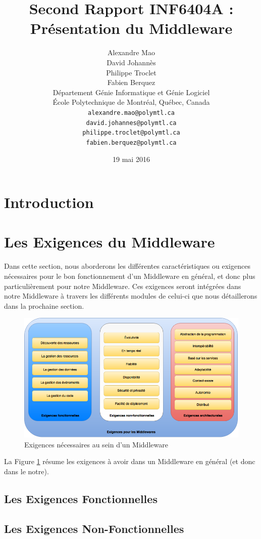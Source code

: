 \documentclass{article}
\title{Second Rapport INF6404A : Présentation du Middleware}
\author{
	Alexandre Mao\\
	David Johannès \\
	Philippe Troclet \\
	Fabien Berquez \\
	D\'{e}partement G\'{e}nie Informatique et G\'{e}nie Logiciel \\
	\'{E}cole Polytechnique de Montr\'{e}al, Qu\'{e}bec, Canada \\
	\texttt{alexandre.mao@polymtl.ca}\\
	\texttt{david.johannes@polymtl.ca}\\
	\texttt{philippe.troclet@polymtl.ca}   \\
	\texttt{fabien.berquez@polymtl.ca}   \\
}
\date{19 mai 2016}
\begin{document}
\maketitle

\section{Introduction}


\section{Les Exigences du Middleware}
Dans cette section, nous aborderons les différentes caractéristiques ou exigences nécessaires pour le bon fonctionnement d'un Middleware en général, et donc plus particulièrement pour notre Middleware. Ces exigences seront intégrées dans notre Middleware à travers les différents modules de celui-ci que nous détaillerons dans la prochaine section.

\begin{figure}[h!]
	\hspace*{-3cm}
	\centering
	\includegraphics[width=1.5\textwidth]{Figure3.png}
	\caption{Exigences nécessaires au sein d'un Middleware}
	\label{fig:exigences}
\end{figure}

La Figure \ref{fig:exigences} résume les exigences à avoir dans un Middleware en général (et donc dans le notre).

\subsection{Les Exigences Fonctionnelles}

\subsection{Les Exigences Non-Fonctionnelles}

\end{document}
